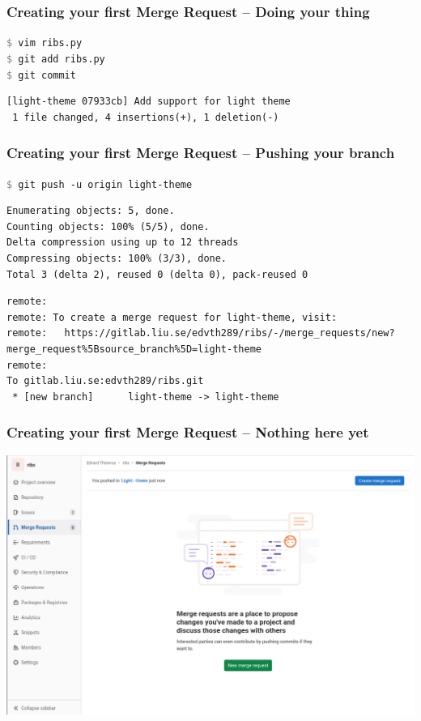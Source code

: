 \documentclass{beamer}
\newcommand{\command}[1]{\texttt{\textcolor{gray}{\$} {#1}}}
\begin{document}
\begin{frame}[fragile]
  \frametitle{Creating your first Merge Request -- Doing your thing}
  \command{vim ribs.py}\\
  \command{git add ribs.py}\\
  \command{git commit}
\begin{verbatim}
[light-theme 07933cb] Add support for light theme
 1 file changed, 4 insertions(+), 1 deletion(-)
\end{verbatim}
\end{frame}

\begin{frame}[fragile]
  \frametitle{Creating your first Merge Request -- Pushing your branch}
  \command{git push -u origin light-theme}
\pause
\vspace{-0.6ex}
{
\color{gray}
\begin{Verbatim}[commandchars=\\\{\}]
Enumerating objects: 5, done.
Counting objects: 100% (5/5), done.
Delta compression using up to 12 threads
Compressing objects: 100% (3/3), done.
Total 3 (delta 2), reused 0 (delta 0), pack-reused 0
\end{Verbatim}
}
\vspace{-1.2ex}
\begin{Verbatim}[commandchars=\\\{\}]
remote:
remote: To create a merge request for light-theme, visit:
remote:   https://gitlab.liu.se/edvth289/ribs/-/merge_requests/new?merge_request%5Bsource_branch%5D=light-theme
remote:
To gitlab.liu.se:edvth289/ribs.git
 * [new branch]      light-theme -> light-theme
\end{Verbatim}
\end{frame}

\begin{frame}[fragile]
  \frametitle{Creating your first Merge Request -- Nothing here yet}
  \includegraphics[width=\linewidth]{merge-request/mr-menu-empty.png}
\end{frame}
\end{document}
